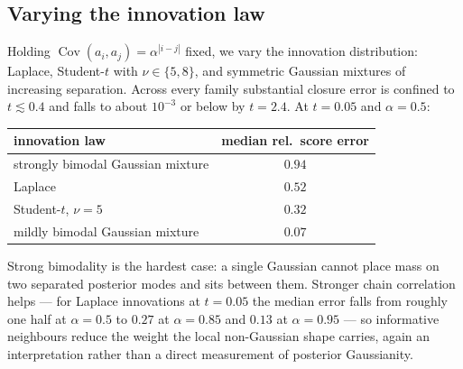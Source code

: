 \subsection{Varying the innovation law}\label{sec:l-innovation-sweep}

Holding $\operatorname{Cov}(a_i,a_j)=\alpha^{|i-j|}$ fixed, we vary the
innovation distribution: Laplace, Student-$t$ with $\nu\in\{5,8\}$, and
symmetric Gaussian mixtures of increasing separation. Across every family
substantial closure error is confined to $t\lesssim0.4$ and falls to about
$10^{-3}$ or below by $t=2.4$. At $t=0.05$ and $\alpha=0.5$:

\begin{center}
\small
\begin{tabular}{@{}lc@{}}
\toprule
innovation law & median rel.\ score error \\
\midrule
strongly bimodal Gaussian mixture & $0.94$ \\
Laplace                           & $0.52$ \\
Student-$t$, $\nu=5$              & $0.32$ \\
mildly bimodal Gaussian mixture   & $0.07$ \\
\bottomrule
\end{tabular}
\end{center}

\noindent Strong bimodality is the hardest case: a single Gaussian cannot
place mass on two separated posterior modes and sits between them. Stronger
chain correlation helps --- for Laplace innovations at $t=0.05$ the median
error falls from roughly one half at $\alpha=0.5$ to $0.27$ at $\alpha=0.85$
and $0.13$ at $\alpha=0.95$ --- so informative neighbours reduce the weight
the local non-Gaussian shape carries, again an interpretation rather than a
direct measurement of posterior Gaussianity.